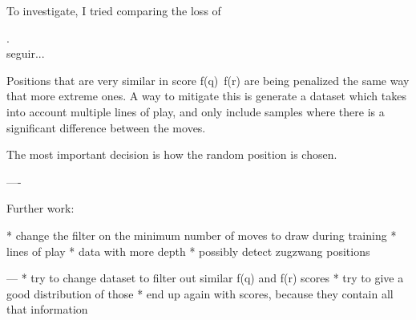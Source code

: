 To investigate, I tried comparing the loss of 

. \\

seguir...

Positions that are very similar in score f(q)~f(r) are being penalized the same way that more extreme ones. A way to mitigate this is generate a dataset which takes into account multiple lines of play, and only include samples where there is a significant difference between the moves.



The most important decision is how the random position is chosen.

----

Further work:

* change the filter on the minimum number of moves to draw during training
* lines of play
* data with more depth
* possibly detect zugzwang positions

---
* try to change dataset to filter out similar f(q) and f(r) scores
* try to give a good distribution of those
* end up again with scores, because they contain all that information
